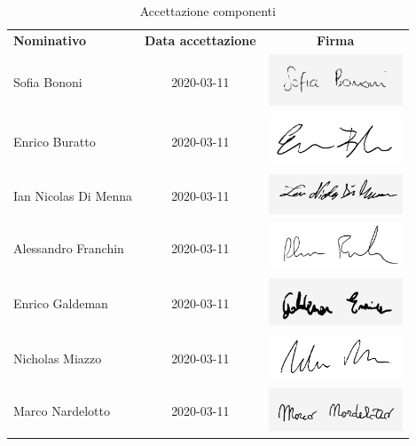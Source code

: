 \documentclass[../piano-di-progetto.tex]{subfiles}
\begin{document}
  \begin{table}[H]
    \centering
    \begin{tabular}{lcc}
      \rowcolor{lightgray}
      \textbf{Nominativo}  & \textbf{Data accettazione} & \textbf{Firma}  \\
      Sofia Bononi & 2020-03-11 & \includegraphics[width=4cm]{img/sofia-g.png} \\
      Enrico Buratto & 2020-03-11 & \includegraphics[width=4cm]{img/enricob.png}     \\
      Ian Nicolas Di Menna & 2020-03-11 & \includegraphics[width=4cm]{img/ian-g.png}     \\
      Alessandro Franchin & 2020-03-11 & \includegraphics[width=4cm]{img/ale.png}     \\
      Enrico Galdeman & 2020-03-11 & \includegraphics[width=4cm]{img/enricog-g.png}     \\
      Nicholas Miazzo & 2020-03-11 & \includegraphics[width=4cm]{img/nicholas.png}     \\
      Marco Nardelotto & 2020-03-11 & \includegraphics[width=4cm]{img/marco-g.png}
    \end{tabular}
    \caption{Accettazione componenti}
  \end{table}
\end{document}
